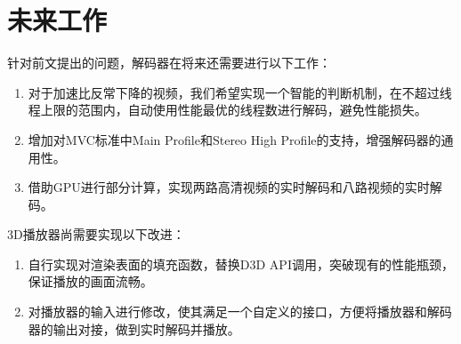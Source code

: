 \section{未来工作}
\label{sec:futurework}

针对前文提出的问题，解码器在将来还需要进行以下工作：
\begin{enumerate}
\item 对于加速比反常下降的视频，我们希望实现一个智能的判断机制，在不超过线程上限的范围内，自动使用性能最优的线程数进行解码，避免性能损失。
\item 增加对MVC标准中Main Profile和Stereo High Profile的支持，增强解码器的通用性。
\item 借助GPU进行部分计算，实现两路高清视频的实时解码和八路视频的实时解码。
\end{enumerate}

3D播放器尚需要实现以下改进：
\begin{enumerate}
\item 自行实现对渲染表面的填充函数，替换D3D API调用，突破现有的性能瓶颈，保证播放的画面流畅。
\item 对播放器的输入进行修改，使其满足一个自定义的接口，方便将播放器和解码器的输出对接，做到实时解码并播放。
\end{enumerate}


